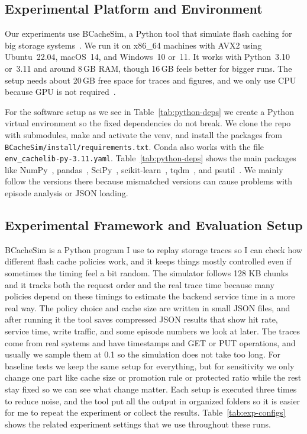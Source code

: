\documentclass[sigconf]{acmart}
\begin{document}
\subsection{Experimental Platform and Environment}

Our experiments use BCacheSim, a Python tool that simulate flash caching for big storage systems~\cite{python}. We run it on x86\_64 machines with AVX2 using Ubuntu~22.04, macOS~14, and Windows~10 or~11. It works with Python~3.10 or~3.11 and around 8\,GB RAM, though 16\,GB feels better for bigger runs. The setup needs about 20\,GB free space for traces and figures, and we only use CPU because GPU is not required~\cite{Yang2022CacheSack,wong2024baleen}.

For the software setup as we see in Table~\ref{tab:python-deps} we create a Python virtual environment so the fixed dependencies do not break. We clone the repo with submodules, make and activate the venv, and install the packages from \texttt{BCacheSim/install/requirements.txt}. Conda also works with the file \texttt{env\_cachelib-py-3.11.yaml}. Table~\ref{tab:python-deps} shows the main packages like NumPy~\cite{numpy}, pandas~\cite{pandas}, SciPy~\cite{scipy}, scikit-learn~\cite{scikit-learn}, tqdm~\cite{tqdm}, and psutil~\cite{psutil}. We mainly follow the versions there because mismatched versions can cause problems with episode analysis or JSON loading.

\subsection{Experimental Framework and Evaluation Setup}
BCacheSim is a Python program I use to replay storage traces so I can check how different flash cache policies work, and it keeps things mostly controlled even if sometimes the timing feel a bit random. The simulator follows 128 KB chunks and it tracks both the request order and the real trace time because many policies depend on these timings to estimate the backend service time in a more real way. The policy choice and cache size are written in small JSON files, and after running it the tool saves compressed JSON results that show hit rate, service time, write traffic, and some episode numbers we look at later. The traces come from real systems and have timestamps and GET or PUT operations, and usually we sample them at 0.1 so the simulation does not take too long. For baseline tests we keep the same setup for everything, but for sensitivity we only change one part like cache size or promotion rule or protected ratio while the rest stay fixed so we can see what change matter. Each setup is executed three times to reduce noise, and the tool put all the output in organized folders so it is easier for me to repeat the experiment or collect the results. Table~\ref{tab:exp-configs} shows the related experiment settings that we use throughout these runs.
\end{document}
